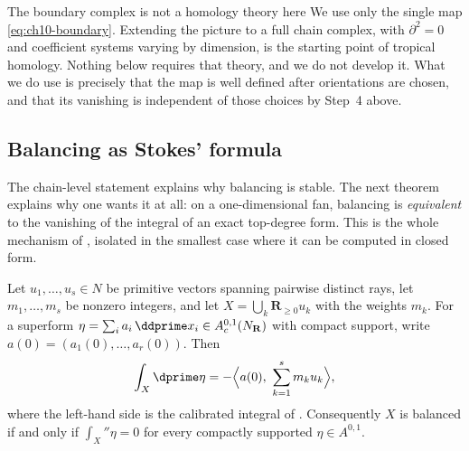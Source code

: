 \begin{warning}{The boundary complex is not a homology theory here}
We use only the single map \eqref{eq:ch10-boundary}.  Extending the picture
to a full chain complex, with $\partial^2=0$ and coefficient systems varying
by dimension, is the starting point of tropical homology.  Nothing below
requires that theory, and we do not develop it.  What we do use is precisely
that the map is well defined after orientations are chosen, and that its
vanishing is independent of those choices by Step~4 above.
\end{warning}

\subsection{Balancing as Stokes' formula}
\label{sec:ch10-balancing-stokes}

The chain-level statement explains why balancing is stable.  The next
theorem explains why one wants it at all: on a one-dimensional fan,
balancing is \emph{equivalent} to the vanishing of the integral of an exact
top-degree form.  This is the whole mechanism of
, isolated in the smallest case where it can be
computed in closed form.

\begin{theorem}
\label{thm:ch10-balancing-stokes-fan}
Let $u_1,\ldots,u_s\in N$ be primitive vectors spanning pairwise distinct
rays, let $m_1,\ldots,m_s$ be nonzero integers, and let
$X=\bigcup_k\mathbf R_{\geq0}u_k$ with the weights $m_k$.  For a superform
$\eta=\sum_{i}a_i\,\ddprime x_i\in A^{0,1}_c(N_{\mathbf R})$ with compact
support, write $a(0)=(a_1(0),\ldots,a_r(0))$.  Then
\begin{equation}
\label{eq:ch10-fan-stokes}
 \int_X\dprime\eta
 =-\Bigl\langle a(0),\ \sum_{k=1}^sm_ku_k\Bigr\rangle,
\end{equation}
where the left-hand side is the calibrated integral of
.  Consequently $X$ is balanced if and only
if $\int_X\dprime\eta=0$ for every compactly supported
$\eta\in A^{0,1}$.
\end{theorem}

